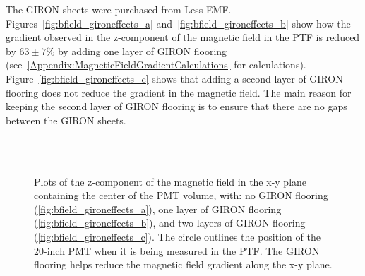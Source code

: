 The GIRON sheets were purchased from Less EMF. Figures~\ref{fig:bfield_gironeffects_a} and~\ref{fig:bfield_gironeffects_b} show how the gradient observed in the z-component of the magnetic field in the PTF is reduced by $ 63\pm7\% $ by adding one layer of GIRON flooring (see~\ref{Appendix:MagneticFieldGradientCalculations} for calculations).
Figure~\ref{fig:bfield_gironeffects_c} shows that adding a second layer of GIRON flooring does not reduce the gradient in the magnetic field. The main reason for keeping the second layer of GIRON flooring is to ensure that there are no gaps between the GIRON sheets.
%
\begin{figure}[htbp]
  \begin{center}
    \\
    \vspace{-3 mm}
    \\
    \vspace{-3 mm}
  \caption{Plots of the z-component of the magnetic field in the x-y plane containing the center of the PMT volume, with: no GIRON flooring (\ref{fig:bfield_gironeffects_a}), one layer of GIRON flooring (\ref{fig:bfield_gironeffects_b}), and two layers of GIRON flooring (\ref{fig:bfield_gironeffects_c}). The circle outlines the position of the 20-inch PMT when it is being measured in the PTF. The GIRON flooring helps reduce the magnetic field gradient along the x-y plane.}
  \label{fig:bfield_gironeffects}
  \end{center}
\end{figure}
%

